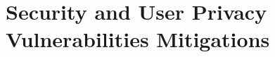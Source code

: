 \section{Security and User Privacy Vulnerabilities Mitigations}\label{sec:security-and-user-privacy-vulnerabilities-mitigations}